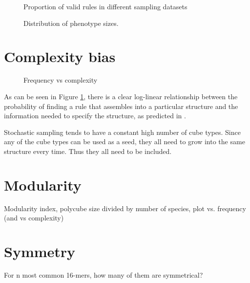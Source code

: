\begin{figure}[h]
    \centering
    \caption{Proportion of valid rules in different sampling datasets}
\end{figure}


\begin{figure}[h]
    \centering
    \caption{Distribution of phenotype sizes.}
\end{figure}


\section{Complexity bias}

\begin{figure}[h]
    \centering
    \centering
    \centering
    \centering
    \caption{Frequency vs complexity}
    \label{fig:freq_vs_compl}
\end{figure}

As can be seen in Figure \ref{fig:freq_vs_compl}, there is a clear log-linear relationship between the probability of finding a rule that assembles into a particular structure and the information needed to specify the structure, as predicted in \cite{dingle2018input, dingle2020generic}.


Stochastic sampling tends to have a constant high number of cube types. Since any of the cube types can be used as a seed, they all need to grow into the same structure every time. Thus they all need to be included.

\section{Modularity}

Modularity index, polycube size divided by number of species, plot vs. frequency (and vs complexity)

\section{Symmetry}
For n most common 16-mers, how many of them are symmetrical?

